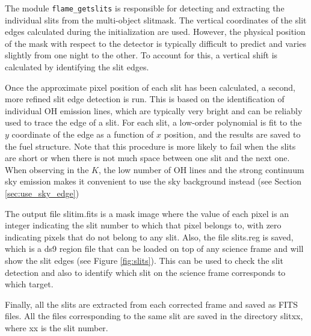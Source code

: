 \documentclass[a4paper, notitlepage]{article}
\begin{document}
The module \texttt{flame\_getslits} is responsible for detecting and extracting the individual slits from the multi-object slitmask. The vertical coordinates of the slit edges calculated during the initialization are used. However, the physical position of the mask with respect to the detector is typically difficult to predict and varies slightly from one night to the other. To account for this, a vertical shift is calculated by identifying the slit edges.

Once the approximate pixel position of each slit has been calculated, a second, more refined slit edge detection is run. This is based on the identification of individual OH emission lines, which are typically very bright and can be reliably used to trace the edge of a slit. For each slit, a low-order polynomial is fit to the $y$ coordinate of the edge as a function of $x$ position, and the results are saved to the fuel structure. Note that this procedure is more likely to fail when the slits are short or when there is not much space between one slit and the next one. When observing in the $K$, the low number of OH lines and the strong continuum sky emission makes it convenient to use the sky background instead (see Section \ref{sec:use_sky_edge})

The output file slitim.fits is a mask image where the value of each pixel is an integer indicating the slit number to which that pixel belongs to, with zero indicating pixels that do not belong to any slit. Also, the file slits.reg is saved, which is a ds9 region file that can be loaded on top of any science frame and will show the slit edges (see Figure \ref{fig:slits}). This can be used to check the slit detection and also to identify which slit on the science frame corresponds to which target.

Finally, all the slits are extracted from each corrected frame and saved as FITS files. All the files corresponding to the same slit are saved in the directory slitxx, where xx is the slit number.
\end{document}
